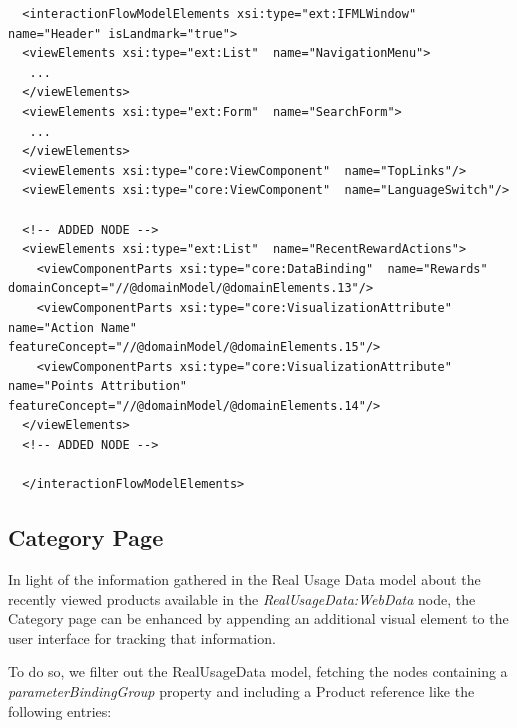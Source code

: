 \vspace{0.5cm}
\lstset{language=XML}
\begin{lstlisting} 
  <interactionFlowModelElements xsi:type="ext:IFMLWindow"  name="Header" isLandmark="true">
  <viewElements xsi:type="ext:List"  name="NavigationMenu">
   ...
  </viewElements>
  <viewElements xsi:type="ext:Form"  name="SearchForm">
   ...
  </viewElements>
  <viewElements xsi:type="core:ViewComponent"  name="TopLinks"/>
  <viewElements xsi:type="core:ViewComponent"  name="LanguageSwitch"/>

  <!-- ADDED NODE -->
  <viewElements xsi:type="ext:List"  name="RecentRewardActions">
    <viewComponentParts xsi:type="core:DataBinding"  name="Rewards" domainConcept="//@domainModel/@domainElements.13"/>
    <viewComponentParts xsi:type="core:VisualizationAttribute"  name="Action Name" featureConcept="//@domainModel/@domainElements.15"/>
    <viewComponentParts xsi:type="core:VisualizationAttribute"  name="Points Attribution" featureConcept="//@domainModel/@domainElements.14"/>
  </viewElements>
  <!-- ADDED NODE -->

  </interactionFlowModelElements>
\end{lstlisting}
\vspace{0.5cm}

\subsection{Category Page}
\label{category-page-updates}

In light of the information gathered in the Real Usage Data model about the recently viewed products available in the \textit{RealUsageData:WebData} node, the Category page can be enhanced by appending an additional visual element to the user interface for tracking that information.

To do so, we filter out the RealUsageData model, fetching the nodes containing a \textit{parameterBindingGroup} property and including a Product reference like the following entries:

